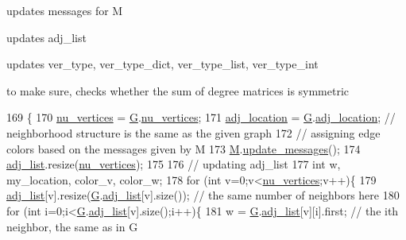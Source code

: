 \begin{DoxyItemize}
\item updates messages for M
\item updates adj\+\_\+list
\item updates ver\+\_\+type, ver\+\_\+type\+\_\+dict, ver\+\_\+type\+\_\+list, ver\+\_\+type\+\_\+int
\item to make sure, checks whether the sum of degree matrices is symmetric 
\end{DoxyItemize}
\begin{DoxyCode}
169 \{
170   \hyperlink{classcolored__graph_a90ece8eb1fec52f3f41549ab527c1d5b}{nu\_vertices} = \hyperlink{classcolored__graph_a39186b56cad58c368d6947656976e18d}{G}.\hyperlink{classmarked__graph_acf79c6aeb8f32614cb14a5baaa6c9f9b}{nu\_vertices};
171   \hyperlink{classcolored__graph_ad657e7e86bee874d19dbc1765e1edaa7}{adj\_location} = \hyperlink{classcolored__graph_a39186b56cad58c368d6947656976e18d}{G}.\hyperlink{classmarked__graph_a3ae722ea9583ad23af34d789a88ac01a}{adj\_location}; \textcolor{comment}{// neighborhood structure is the same as the
       given graph}
172   \textcolor{comment}{// assigning edge colors based on the messages given by M}
173   \hyperlink{classcolored__graph_ab72c568fe12f7c849ca6bffb145aec47}{M}.\hyperlink{classgraph__message_a611832eb2767873fbff7b07c5790570d}{update\_messages}();
174   \hyperlink{classcolored__graph_a45dce16965079286cf3f41a54a1b2ea4}{adj\_list}.resize(\hyperlink{classcolored__graph_a90ece8eb1fec52f3f41549ab527c1d5b}{nu\_vertices});
175 
176   \textcolor{comment}{// updating adj\_list}
177   \textcolor{keywordtype}{int} w, my\_location, color\_v, color\_w;
178   \textcolor{keywordflow}{for} (\textcolor{keywordtype}{int} v=0;v<\hyperlink{classcolored__graph_a90ece8eb1fec52f3f41549ab527c1d5b}{nu\_vertices};v++)\{
179     \hyperlink{classcolored__graph_a45dce16965079286cf3f41a54a1b2ea4}{adj\_list}[v].resize(\hyperlink{classcolored__graph_a39186b56cad58c368d6947656976e18d}{G}.\hyperlink{classmarked__graph_a1a0bf7ca413a278763f7c878b3b6fd6f}{adj\_list}[v].size()); \textcolor{comment}{// the same number of neighbors here}
180     \textcolor{keywordflow}{for} (\textcolor{keywordtype}{int} i=0;i<\hyperlink{classcolored__graph_a39186b56cad58c368d6947656976e18d}{G}.\hyperlink{classmarked__graph_a1a0bf7ca413a278763f7c878b3b6fd6f}{adj\_list}[v].size();i++)\{
181       w = \hyperlink{classcolored__graph_a39186b56cad58c368d6947656976e18d}{G}.\hyperlink{classmarked__graph_a1a0bf7ca413a278763f7c878b3b6fd6f}{adj\_list}[v][i].first; \textcolor{comment}{// the ith neighbor, the same as in G}

\end{DoxyCode}
